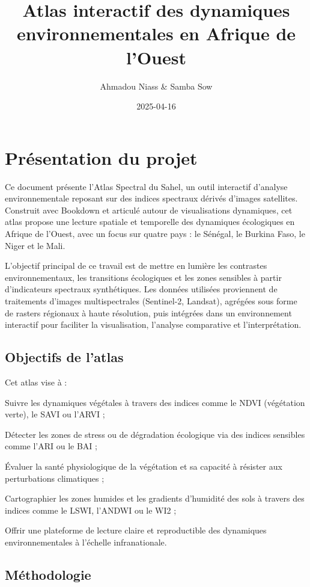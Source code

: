 \documentclass[
]{book}
\title{Atlas interactif des dynamiques environnementales en Afrique de l'Ouest}
\author{Ahmadou Niass \& Samba Sow}
\date{2025-04-16}
\begin{document}
\maketitle

{
\setcounter{tocdepth}{1}
\tableofcontents
}
\chapter{Présentation du projet}\label{pruxe9sentation-du-projet}

Ce document présente l'Atlas Spectral du Sahel, un outil interactif d'analyse environnementale reposant sur des indices spectraux dérivés d'images satellites. Construit avec Bookdown et articulé autour de visualisations dynamiques, cet atlas propose une lecture spatiale et temporelle des dynamiques écologiques en Afrique de l'Ouest, avec un focus sur quatre pays : le Sénégal, le Burkina Faso, le Niger et le Mali.

L'objectif principal de ce travail est de mettre en lumière les contrastes environnementaux, les transitions écologiques et les zones sensibles à partir d'indicateurs spectraux synthétiques. Les données utilisées proviennent de traitements d'images multispectrales (Sentinel-2, Landsat), agrégées sous forme de rasters régionaux à haute résolution, puis intégrées dans un environnement interactif pour faciliter la visualisation, l'analyse comparative et l'interprétation.

\section{Objectifs de l'atlas}\label{objectifs-de-latlas}

Cet atlas vise à :

Suivre les dynamiques végétales à travers des indices comme le NDVI (végétation verte), le SAVI ou l'ARVI ;

Détecter les zones de stress ou de dégradation écologique via des indices sensibles comme l'ARI ou le BAI ;

Évaluer la santé physiologique de la végétation et sa capacité à résister aux perturbations climatiques ;

Cartographier les zones humides et les gradients d'humidité des sols à travers des indices comme le LSWI, l'ANDWI ou le WI2 ;

Offrir une plateforme de lecture claire et reproductible des dynamiques environnementales à l'échelle infranationale.

\section{Méthodologie}\label{muxe9thodologie}
\end{document}
